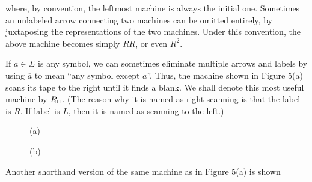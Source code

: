 \begin{example}{}
\begin{figure}[H]
\begin{minipage}{.3\linewidth}
  \end{minipage}
\end{figure}
where, by convention, the leftmost machine is always the initial one. Sometimes an unlabeled arrow connecting two machines can be omitted entirely, by juxtaposing the representations of the two machines. Under this convention, the above machine becomes simply $RR$, or even $R^2$.
\end{example}

\begin{example}{}
If $a \in \Sigma$ is any symbol, we can sometimes eliminate multiple arrows and labels by using $\overline{a}$ to mean ``any symbol except $a$''. Thus, the machine shown in Figure 5(a) scans its tape to the right until it finds a blank. We shall denote this most useful machine by $R_{\sqcup}$. (The reason why it is named as right scanning is that the label is $R$. If label is $L$, then it is named as scanning to the left.)
\begin{figure}[H]
  \centering
  \begin{minipage}{.49\linewidth}
    \centering
    \caption*{(a)}
  \end{minipage}
  \begin{minipage}{.49\linewidth}
    \centering
    \caption*{(b)}
  \end{minipage}
  \caption{}
  \label{fig:4.5}
\end{figure}
Another shorthand version of the same machine as in Figure 5(a) is shown 

\end{example}
